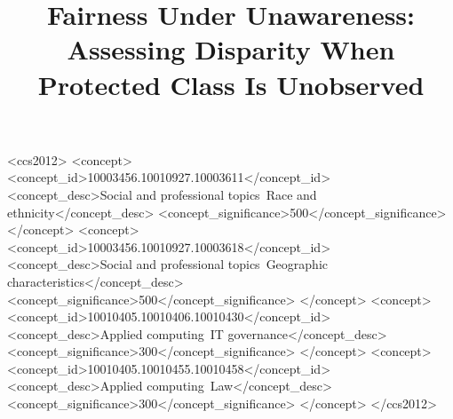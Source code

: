 \documentclass[format=sigconf,letterpaper,9pt]{acmart}
\theoremstyle{definition}
\begin{document}
\title[Fairness Under Unawareness]{Fairness Under Unawareness:\\Assessing Disparity When Protected Class Is Unobserved}







\begin{CCSXML}
	<ccs2012>
	<concept>
	<concept_id>10003456.10010927.10003611</concept_id>
	<concept_desc>Social and professional topics~Race and ethnicity</concept_desc>
	<concept_significance>500</concept_significance>
	</concept>
	<concept>
	<concept_id>10003456.10010927.10003618</concept_id>
	<concept_desc>Social and professional topics~Geographic characteristics</concept_desc>
	<concept_significance>500</concept_significance>
	</concept>
	<concept>
	<concept_id>10010405.10010406.10010430</concept_id>
	<concept_desc>Applied computing~IT governance</concept_desc>
	<concept_significance>300</concept_significance>
	</concept>
	<concept>
	<concept_id>10010405.10010455.10010458</concept_id>
	<concept_desc>Applied computing~Law</concept_desc>
	<concept_significance>300</concept_significance>
	</concept>
	</ccs2012>
\end{CCSXML}


\maketitle











\clearpage

\end{document}
